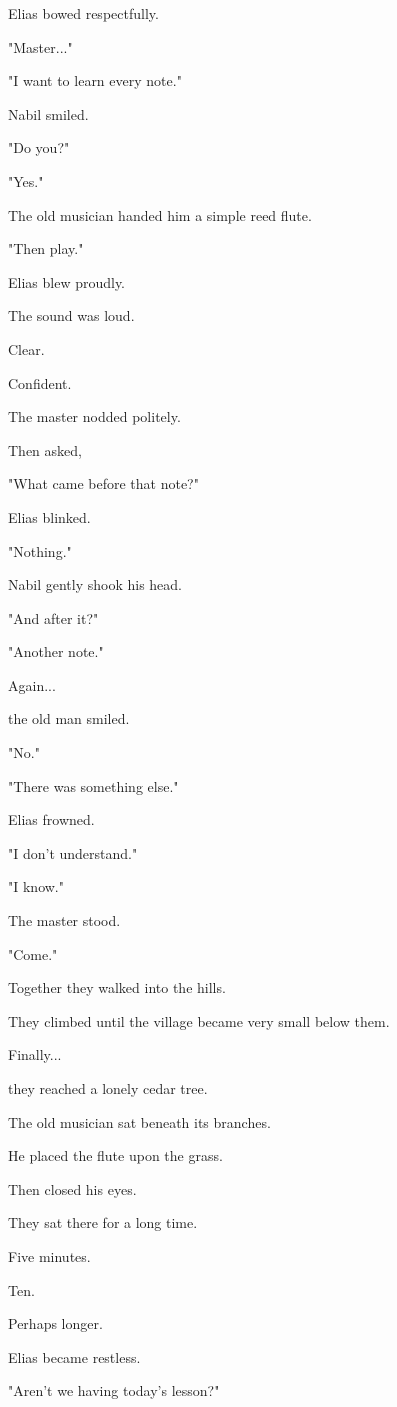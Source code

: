 \documentclass[12pt,openany]{book}
\begin{document}
Elias bowed respectfully.

"Master..."

"I want to learn every note."

Nabil smiled.

"Do you?"

"Yes."

The old musician handed him a simple reed flute.

"Then play."

Elias blew proudly.

The sound was loud.

Clear.

Confident.

The master nodded politely.

Then asked,

"What came before that note?"

Elias blinked.

"Nothing."

Nabil gently shook his head.

"And after it?"

"Another note."

Again...

the old man smiled.

"No."

"There was something else."

Elias frowned.

"I don't understand."

"I know."

The master stood.

"Come."

Together they walked into the hills.

They climbed until the village became very small below them.

Finally...

they reached a lonely cedar tree.

The old musician sat beneath its branches.

He placed the flute upon the grass.

Then closed his eyes.

They sat there for a long time.

Five minutes.

Ten.

Perhaps longer.

Elias became restless.

"Aren't we having today's lesson?"
\end{document}

